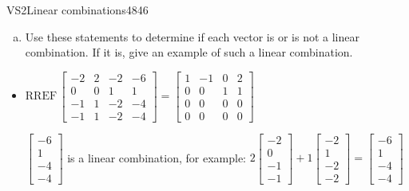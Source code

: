 \documentclass{article}
\newenvironment{exerciseStatement}{}{}
\begin{document}
\begin{exercise}{VS2}{Linear combinations}{4846}
\begin{exerciseStatement}
\begin{enumerate}[(a)]
\begin{itemize}
 
\end{itemize}

     
\item   Use these statements to determine if each vector is or is not a linear combination. If it is, give an example of such a linear combination. 

 
\end{enumerate}

     \end{exerciseStatement}
 \begin{exerciseAnswer} 

\begin{itemize}
\item   \(
\mathrm{RREF}\, \left[\begin{array}{ccc|c}
-2 & 2 & -2 & -6 \\
0 & 0 & 1 & 1 \\
-1 & 1 & -2 & -4 \\
-1 & 1 & -2 & -4
\end{array}\right] = \left[\begin{array}{ccc|c}
1 & -1 & 0 & 2 \\
0 & 0 & 1 & 1 \\
0 & 0 & 0 & 0 \\
0 & 0 & 0 & 0
\end{array}\right]
                        \) 

 

 \(\left[\begin{array}{c}
-6 \\
1 \\
-4 \\
-4
\end{array}\right]\) is a linear combination, for example: \(
2 \left[\begin{array}{c}
-2 \\
0 \\
-1 \\
-1
\end{array}\right] + 1 \left[\begin{array}{c}
-2 \\
1 \\
-2 \\
-2
\end{array}\right] = \left[\begin{array}{c}
-6 \\
1 \\
-4 \\
-4
\end{array}\right]
                            \) 


\end{itemize}
\end{exerciseAnswer}
\end{exercise}
\end{document}

